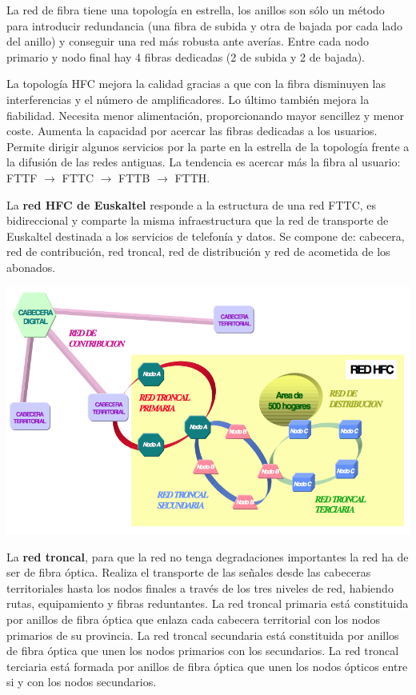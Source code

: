 \documentclass[10pt,portrait, twocolumn]{article}
\begin{document}
La red de fibra tiene una topología en estrella, los anillos son sólo un método para introducir redundancia (una fibra de subida y otra de bajada por cada lado del anillo) y conseguir una red más robusta ante averías. Entre cada nodo primario y nodo final hay 4 fibras dedicadas (2 de subida y 2 de bajada).

La topología HFC mejora la calidad gracias a que con la fibra disminuyen las interferencias y el número de amplificadores. Lo último también mejora la fiabilidad. Necesita menor alimentación, proporcionando mayor sencillez y menor coste. Aumenta la capacidad por acercar las fibras dedicadas a los usuarios. Permite dirigir algunos servicios por la parte en la estrella de la topología frente a la difusión de las redes antiguas. La tendencia es acercar más la fibra al usuario: FTTF $\rightarrow$ FTTC $\rightarrow$ FTTB $\rightarrow$ FTTH.

La \textbf{red HFC de Euskaltel} responde a la estructura de una red FTTC, es bidireccional y comparte la misma infraestructura que la red de transporte de Euskaltel destinada a los servicios de telefonía y datos. Se compone de: cabecera, red de contribución, red troncal, red de distribución y red de acometida de los abonados.

	\begin{center}
		\includegraphics[scale=0.2]{images/Euskaltel}
	\end{center}
	
La \textbf{red troncal}, para que la red no tenga degradaciones importantes la red ha de ser de fibra óptica. Realiza el transporte de las señales desde las cabeceras territoriales hasta los nodos finales a través de los tres niveles de red, habiendo rutas, equipamiento y fibras reduntantes. La red troncal primaria está constituida por anillos de fibra óptica que enlaza cada cabecera territorial con los nodos primarios de su provincia. La red troncal secundaria está constituida por anillos de fibra óptica que unen los nodos primarios con los secundarios. La red troncal terciaria está formada por anillos de fibra óptica que unen los nodos ópticos entre si y con los nodos secundarios.
\end{document}
